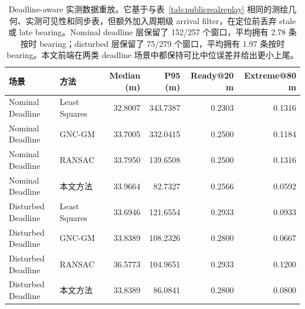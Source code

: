 \begin{table}[!htbp]
\centering
\caption{Deadline-aware 实测数据重放。它基于与表~\ref{tab:publicrealreplay} 相同的测绘几何、实测可见性和同步表，但额外加入周期级 arrival filter，在定位前丢弃 stale 或 late bearing。Nominal deadline 层保留了 152/257 个窗口，平均拥有 2.78 条按时 bearing；disturbed 层保留了 75/279 个窗口，平均拥有 1.97 条按时 bearing。本文前端在两类 deadline 场景中都保持可比中位误差并给出更小上尾。}
\label{tab:deadlinereplay}
\begingroup
\setlength{\tabcolsep}{4pt}
\small
\begin{tabular}{@{}llrrrr@{}}
\toprule
场景 & 方法 & Median (m) & P95 (m) & Ready@20 m & Extreme@80 m \\
\midrule
Nominal Deadline   & Least Squares & 32.8007 & 343.7387 & 0.2303 & 0.1316 \\
Nominal Deadline   & GNC-GM        & 33.7005 & 332.0415 & 0.2500 & 0.1184 \\
Nominal Deadline   & RANSAC        & 33.7950 & 139.6508 & 0.2500 & 0.1316 \\
Nominal Deadline   & 本文方法       & 33.9664 &  82.7327 & 0.2566 & 0.0592 \\
\midrule
Disturbed Deadline & Least Squares & 33.6946 & 121.6554 & 0.2933 & 0.0933 \\
Disturbed Deadline & GNC-GM        & 33.8389 & 108.2326 & 0.2800 & 0.0667 \\
Disturbed Deadline & RANSAC        & 36.5773 & 104.9651 & 0.2933 & 0.1200 \\
Disturbed Deadline & 本文方法       & 33.8389 &  86.0841 & 0.2800 & 0.0800 \\
\bottomrule
\end{tabular}
\endgroup
\end{table}
